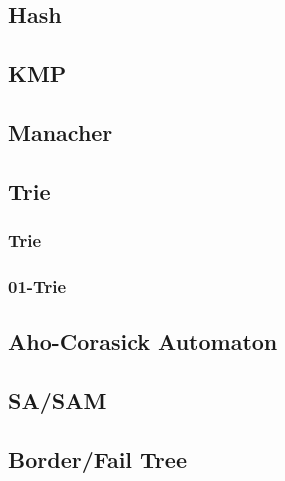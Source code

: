 \documentclass[a4paper]{article}
\begin{document}
\subsection{Hash}



\subsection{KMP}



\subsection{Manacher}



\subsection{Trie}

\subsubsection{Trie}



\subsubsection{01-Trie}



\subsection{Aho-Corasick Automaton}

\subsection{SA/SAM}



\subsection{Border/Fail Tree}
\end{document}
